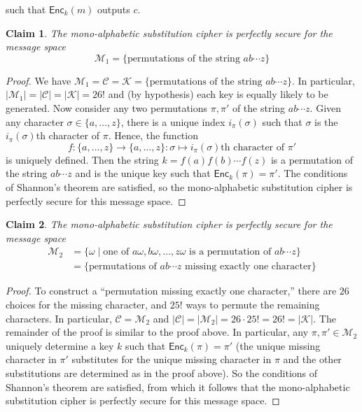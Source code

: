 \documentclass[12pt]{article}
\numberwithin{equation}{section}
\theoremstyle{plain}
\newtheorem{claim}{Claim}
\newenvironment{booktheorem}[1]{%
\renewcommand\thebooktheoremX{#1}%
\booktheoremX
}{\endbooktheoremX}
\newcommand{\set}[1]{\{ #1 \}}
\newcommand{\ctexts}{\mathcal{C}}
\newcommand{\ptexts}{\mathcal{M}}
\newcommand{\keys}{\mathcal{K}}
\newcommand{\algo}[1]{\mathsf{#1}}
\newcommand{\enc}{\algo{Enc}}
\begin{document}
\begin{enumerate}
\begin{booktheorem}{2.11 (Shannon's theorem)}
    such that $\enc_k(m)$ outputs $c$.
    \end{booktheorem}
    \begin{claim}
    The mono-alphabetic substitution cipher is perfectly secure for the message space
    \begin{equation*}
        \ptexts_1 = \set{ \text{permutations of the string } ab\cdots z }
    \end{equation*}
    \end{claim}
    \begin{proof}
    We have $\ptexts_1 = \ctexts = \keys = \set{ \text{permutations of the string } ab\cdots z}$.
    In particular, $|\ptexts_1| = |\ctexts| = |\keys| = 26!$
    and (by hypothesis) each key is equally likely to be generated.
    Now consider any two permutations $\pi, \pi'$
    of the string $ab\cdots z$.
    Given any character $\sigma \in \set{ a, \ldots, z }$,
    there is a unique index $i_{\pi}(\sigma)$
    such that $\sigma$ is the $i_{\pi}(\sigma)$th character of $\pi$.
    Hence, the function
    \begin{equation*}
        f : \set{a,\ldots,z} \to \set{a,\ldots,z}
          : \sigma \mapsto i_{\pi}(\sigma)\text{th character of }\pi'
    \end{equation*}
    is uniquely defined.
    Then the string $k = f(a)f(b)\cdots f(z)$
    is a permutation of the string $ab\cdots z$
    and is the unique key such that $\enc_k(\pi) = \pi'$.
    The conditions of Shannon's theorem are satisfied,
    so the mono-alphabetic substitution cipher is perfectly secure for this message space.
    \end{proof}
    \begin{claim}
    The mono-alphabetic substitution cipher is perfectly secure for the message space
    \begin{align*}
        \ptexts_2
            &= \set{ \omega \mid \text{one of } a\omega, b\omega, \ldots, z\omega \text{ is a permutation of } ab\cdots z }\\
            &= \set{ \text{permutations of } ab\cdots z \text{ missing exactly one character} }
    \end{align*}
    \end{claim}
    \begin{proof}
    To construct a ``permutation missing exactly one character,''
    there are $26$ choices for the missing character,
    and $25!$ ways to permute the remaining characters.
    In particular, $\ctexts = \ptexts_2$
    and $|\ctexts| = |\ptexts_2| = 26 \cdot 25! = 26! = |\keys|$.
    The remainder of the proof is similar to the proof above.
    In particular, any $\pi, \pi' \in \ptexts_2$ uniquely determine
    a key $k$ such that $\enc_k(\pi) = \pi'$
    (the unique missing character in $\pi'$
    substitutes for the unique missing character in $\pi$
    and the other substitutions are determined as in the proof above).
    So the conditions of Shannon's theorem are satisfied,
    from which it follows that
    the mono-alphabetic substitution cipher is perfectly secure for this message space.
    \end{proof}
    

\end{enumerate}
\end{document}
